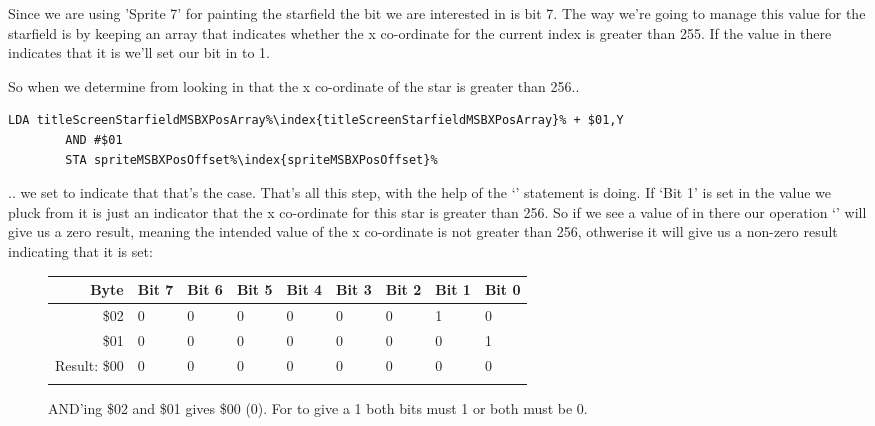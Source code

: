 Since we are using 'Sprite 7' for painting the starfield the bit we are interested in is bit 7. The way
we're going to manage this value for the starfield is by keeping an array 
that indicates whether the x co-ordinate for the current index is greater than 255. If the value in there
indicates that it is we'll set our bit in  to 1.

So when
we determine from looking in  that the x co-ordinate of the star is greater
than 256..

\begin{lstlisting}[escapechar=\%]
        LDA titleScreenStarfieldMSBXPosArray%\index{titleScreenStarfieldMSBXPosArray}% + $01,Y
        AND #$01
        STA spriteMSBXPosOffset%\index{spriteMSBXPosOffset}%
\end{lstlisting}

.. we set  to indicate that that's the case. That's all this step, with the help
of the `' statement is doing. If `Bit 1' is
set in the value we pluck from  it is just an indicator that the x co-ordinate
for this star is greater than 256. So if we see a value of  in there our operation `' will
give us a zero result, meaning the intended value of the x co-ordinate is not greater than 256, othwerise it will give
us a non-zero result indicating that it is set:

\begin{figure}[H]
  {
    \setlength{\tabcolsep}{3.0pt}
    \setlength\cmidrulewidth{\heavyrulewidth} %
    \begin{adjustbox}{width=10cm,center}

      \begin{tabular}{rllllllll}
        \toprule
        Byte & Bit 7 & Bit 6 & Bit 5 & Bit 4 & Bit 3 & Bit 2 & Bit 1 & Bit 0        \\
        \midrule
        \$02 & 0 & 0 & 0 & 0 & 0 & 0 & 1 & 0 \\
        \$01 & 0 & 0 & 0 & 0 & 0 & 0 & 0 & 1 \\
        \midrule
        Result: \$00 & 0 & 0 & 0 & 0 & 0 & 0 & 0 & 0 \\
        \addlinespace
        \bottomrule
      \end{tabular}
    \end{adjustbox}
  }\caption*{AND'ing \$02 and \$01 gives \$00 (0). For  to give a 1 both bits must 1 or both must be 0.}
\end{figure}

